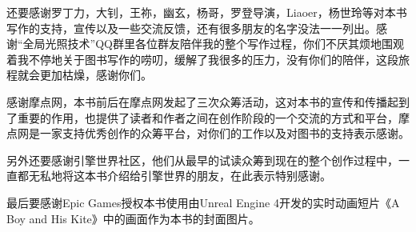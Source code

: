 还要感谢罗丁力，大钊，王祢，幽玄，杨哥，罗登导演，Liaoer，杨世玲等对本书写作的支持，宣传以及一些交流反馈，还有很多朋友的名字没法一一列出。感谢“全局光照技术”QQ群里各位群友陪伴我的整个写作过程，你们不厌其烦地围观着我不停地关于图书写作的唠叨，缓解了我很多的压力，没有你们的陪伴，这段旅程就会更加枯燥，感谢你们。

感谢摩点网，本书前后在摩点网发起了三次众筹活动，这对本书的宣传和传播起到了重要的作用，也提供了读者和作者之间在创作阶段的一个交流的方式和平台，摩点网是一家支持优秀创作的众筹平台，对你们的工作以及对图书的支持表示感谢。

另外还要感谢引擎世界社区，他们从最早的试读众筹到现在的整个创作过程中，一直都无私地将这本书介绍给引擎世界的朋友，在此表示特别感谢。

最后要感谢Epic Games授权本书使用由Unreal Engine 4开发的实时动画短片《A Boy and His Kite》中的画面作为本书的封面图片。

	

\vspace{\baselineskip}
\vspace{\baselineskip}
\begin{flushright}\noindent
\hfill {\it }\\
 \hfill {\it }\\
\end{flushright}


\vspace{\baselineskip}
\vspace{\baselineskip}
\vspace{\baselineskip}


